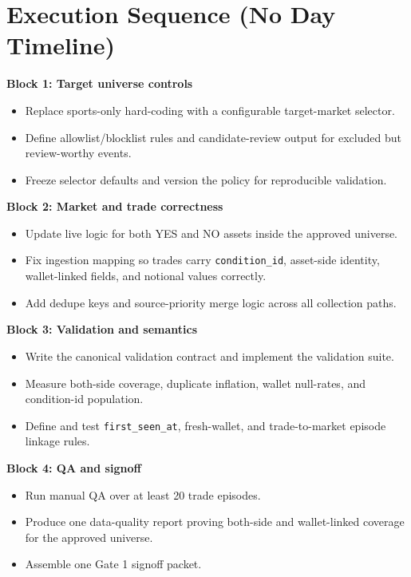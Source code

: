 \documentclass{article}
\begin{document}
\section*{Execution Sequence (No Day Timeline)}
\textbf{Block 1: Target universe controls}
\begin{itemize}
\item Replace sports-only hard-coding with a configurable target-market selector.
\item Define allowlist/blocklist rules and candidate-review output for excluded but review-worthy events.
\item Freeze selector defaults and version the policy for reproducible validation.
\end{itemize}

\textbf{Block 2: Market and trade correctness}
\begin{itemize}
\item Update live logic for both YES and NO assets inside the approved universe.
\item Fix ingestion mapping so trades carry \texttt{condition\_id}, asset-side identity, wallet-linked fields, and notional values correctly.
\item Add dedupe keys and source-priority merge logic across all collection paths.
\end{itemize}

\textbf{Block 3: Validation and semantics}
\begin{itemize}
\item Write the canonical validation contract and implement the validation suite.
\item Measure both-side coverage, duplicate inflation, wallet null-rates, and condition-id population.
\item Define and test \texttt{first\_seen\_at}, fresh-wallet, and trade-to-market episode linkage rules.
\end{itemize}

\textbf{Block 4: QA and signoff}
\begin{itemize}
\item Run manual QA over at least 20 trade episodes.
\item Produce one data-quality report proving both-side and wallet-linked coverage for the approved universe.
\item Assemble one Gate 1 signoff packet.
\end{itemize}
\end{document}
